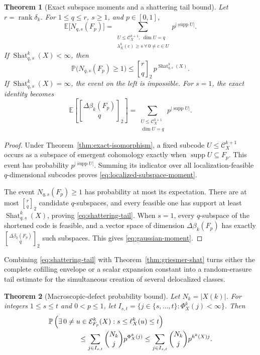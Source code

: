 \documentclass[11pt,letterpaper]{article}
\theoremstyle{plain}
\newtheorem{theorem}{Theorem}[section]
\theoremstyle{definition}
\newcommand{\E}{\mathbb{E}}
\newcommand{\Prob}{\mathbb{P}}
\newcommand{\cC}{\mathcal{C}}
\newcommand{\cE}{\mathcal{E}}
\newcommand{\supp}{\operatorname{supp}}
\newcommand{\rank}{\operatorname{rank}}
\newcommand{\Shat}{\operatorname{Shat}}
\newcommand{\1}{\mathbf{1}}
\newcommand{\abs}[1]{\left|#1\right|}
\newcommand{\qbinom}[2]{\genfrac{[}{]}{0pt}{}{#1}{#2}_{2}}
\begin{document}
\begin{theorem}[Exact subspace moments and a shattering tail bound]
\label{thm:subspace-moments}
Let $r=\rank\delta_k$.  For $1\le q\le r$, $s\ge1$, and $p\in[0,1]$,
\begin{equation}\label{eq:localized-subspace-moment}
 \E\bigl[N_{q,s}(F_p)\bigr]
 =
 \sum_{\substack{U\le\cC_X^{k+1},\ \dim U=q\\
                   \lambda_X^k(c)\ge s\ \forall\,0\ne c\in U}}
 p^{\abs{\supp U}}.
\end{equation}
If $\Shat_{q,s}^k(X)<\infty$, then
\begin{equation}\label{eq:shattering-tail}
 \Prob\bigl(N_{q,s}(F_p)\ge1\bigr)
 \le
 \qbinom{r}{q}\,p^{\Shat_{q,s}^k(X)}.
\end{equation}
If $\Shat_{q,s}^k(X)=\infty$, the event on the left is impossible.  For $s=1$, the exact
identity becomes
\begin{equation}\label{eq:gaussian-moment}
 \E\left[\qbinom{\Delta\beta_k(F_p)}{q}\right]
 =
 \sum_{\substack{U\le\cC_X^{k+1}\\\dim U=q}}
 p^{\abs{\supp U}}.
\end{equation}
\end{theorem}

\begin{proof}
Under Theorem~\ref{thm:exact-isomorphism}, a fixed subcode
$U\le\cC_X^{k+1}$ occurs as a subspace of emergent cohomology exactly when
$\supp U\subseteq F_p$.  This event has probability $p^{\abs{\supp U}}$.
Summing its indicator over all localization-feasible $q$-dimensional subcodes proves
\eqref{eq:localized-subspace-moment}.

The event $N_{q,s}(F_p)\ge1$ has probability at most its expectation.  There are at most
$\qbinom{r}{q}$ candidate $q$-subspaces, and every feasible one has support at least
$\Shat_{q,s}^k(X)$, proving \eqref{eq:shattering-tail}.  When $s=1$, every
$q$-subspace of the shortened code is feasible, and a vector space of dimension
$\Delta\beta_k(F_p)$ has exactly $\qbinom{\Delta\beta_k(F_p)}{q}$ such
subspaces.  This gives \eqref{eq:gaussian-moment}.
\end{proof}

Combining \eqref{eq:shattering-tail} with Theorem~\ref{thm:griesmer-shat} turns either
the complete cofilling envelope or a scalar expansion constant into a random-erasure
tail estimate for the simultaneous creation of several delocalized classes.

\begin{theorem}[Macroscopic-defect probability bound]\label{thm:probability}
Let $N_k=\abs{X(k)}$.  For integers $1\le s\le t$ and $0<p\le1$, let
$I_{s,t}=\{j\in\{s,\ldots,t\}:\Phi_X^k(j)<\infty\}$.  Then
\begin{align}
 &\Prob\left(\exists\,0\ne u\in\cE_{F_p}^k(X):
 s\le\ell_X^k(u)\le t
 \right)\notag\\
 &\hspace{15mm}\le
 \sum_{j\in I_{s,t}}\binom{N_k}{j}p^{\Phi_X^k(j)}
 \le
 \sum_{j\in I_{s,t}}\binom{N_k}{j}p^{h^k(X)j}.
 \label{eq:probability}
\end{align}
\end{theorem}
\end{document}
